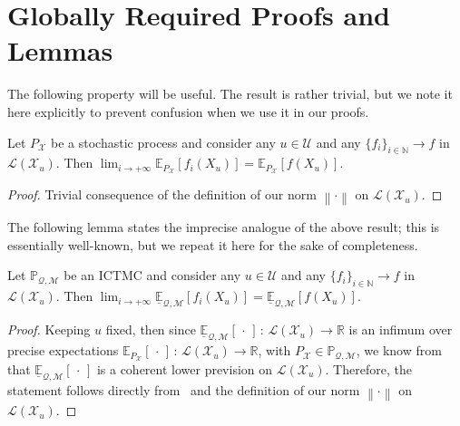 \documentclass[twoside,11pt]{article}
\newcommand{\nats}{\mathbb{N}}
\newcommand{\reals}{\mathbb{R}}
\newcommand{\states}{\mathcal{X}}
\newcommand{\lexp}{\underline{\mathbb{E}}_{\rateset,\mathcal{M}}}
\newcommand{\gambles}{\mathcal{L}}
\newcommand{\rateset}{\mathcal{Q}}
\newcommand{\norm}[1]{\left\lVert #1 \right\rVert}
\begin{document}
\section{Globally Required Proofs and Lemmas}

The following property will be useful. The result is rather trivial, but we note it here explicitly to prevent confusion when we use it in our proofs.
\begin{lemma}\label{lemma:limit_exp_is_exp_limit}
Let $P_\states$ be a stochastic process and consider any $u\in\mathcal{U}$ and any $\{f_i\}_{i\in\nats}\to f$ in $\gambles(\states_u)$. Then $\lim_{i\to+\infty}\mathbb{E}_{P_\states}[f_i(X_u)]=\mathbb{E}_{P_\states}[f(X_u)]$.
\end{lemma}
\begin{proof}
Trivial consequence of the definition of our norm $\norm{\cdot}$ on $\gambles(\states_u)$.
\end{proof}

The following lemma states the imprecise analogue of the above result; this is essentially well-known, but we repeat it here for the sake of completeness.

\begin{lemma}\label{lemma:limit_lexp_is_lexp_limit}
Let $\mathbb{P}_{\rateset,\mathcal{M}}$ be an ICTMC and consider any $u\in\mathcal{U}$ and any $\{f_i\}_{i\in\nats}\to f$ in $\gambles(\states_u)$. Then $\lim_{i\to+\infty}\lexp[f_i(X_u)]=\lexp[f(X_u)]$.
\end{lemma}
\begin{proof}
Keeping $u$ fixed, then since $\lexp[\,\cdot\,]\,:\,\gambles(\states_u)\to\reals$ is an infimum over precise expectations $\mathbb{E}_{P_\states}[\,\cdot\,]\,:\,\gambles(\states_u)\to\reals$, with $P_\states\in\mathbb{P}_{\rateset,\mathcal{M}}$, we know from~\cite[Theorem 3.3.3]{Walley:1991vk} that $\lexp[\,\cdot\,]$ is a coherent lower prevision on $\gambles(\states_u)$. Therefore, the statement follows directly from~\cite[Proposition 2.6.1.$\ell$]{Walley:1991vk} and the definition of our norm $\norm{\cdot}$ on $\gambles(\states_u)$.
\end{proof}
\end{document}
